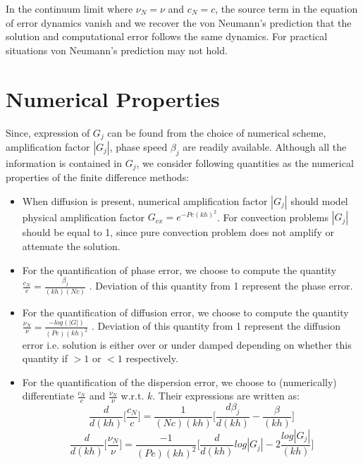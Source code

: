 \documentclass[fleqn]{article}
\begin{document}
In the continuum limit where $\nu_N = \nu$ and $c_N = c$, the source term in the equation of error dynamics vanish and we recover the von Neumann's prediction that the solution and computational error follows the same dynamics. For practical situations von Neumann's prediction may not hold. 

\section{Numerical Properties}
Since, expression of $G_j$ can be found from the choice of numerical scheme, amplification factor $|G_j|$, phase speed $\beta_j$ are readily available. Although all the information is contained in $G_j$, we consider following quantities as the numerical properties of the finite difference methods:
\begin{itemize}
\item When diffusion is present, numerical amplification factor $|G_j|$ should model physical amplification factor $G_{ex} = e^{-Pe (kh)^2}$. For convection problems $|G_j|$ should be equal to 1, since pure convection problem does not amplify or attenuate the solution.

\item For the quantification of phase error, we choose to compute the quantity $\frac{c_N}{c} = \frac{\beta_j}{(kh)(Nc)}$ . Deviation of this quantity from 1 represent the phase error.

\item For the quantification of diffusion error, we choose to compute the quantity $\frac{\nu_N}{\nu} = \frac{-log(|G|)}{(Pe)(kh)^2}$ . Deviation of this quantity from 1 represent the diffusion error i.e. solution is either over or under damped depending on whether this quantity if $> 1$ or $< 1$ respectively.

\item For the quantification of the dispersion error, we choose to (numerically) differentiate $\frac{c_N}{c}$ and $\frac{\nu_N}{\nu}$ w.r.t. $k$. Their expressions are written as:
\begin{equation*}
\frac{d}{d(kh)} \bigg[\frac{c_N}{c}\bigg] = \frac{1}{(Nc)(kh)} \bigg[ \frac{d \beta_j}{d (kh)} - \frac{\beta}{(kh)} \bigg]
\end{equation*}
\begin{equation*}
\frac{d}{d(kh)} \bigg[\frac{\nu_N}{\nu}\bigg] = \frac{-1}{(Pe)(kh)^2} \bigg[ \frac{d }{d (kh)} log|G_j| - 2\frac{log|G_j|}{(kh)} \bigg]
\end{equation*}
\end{itemize}
\end{document}
